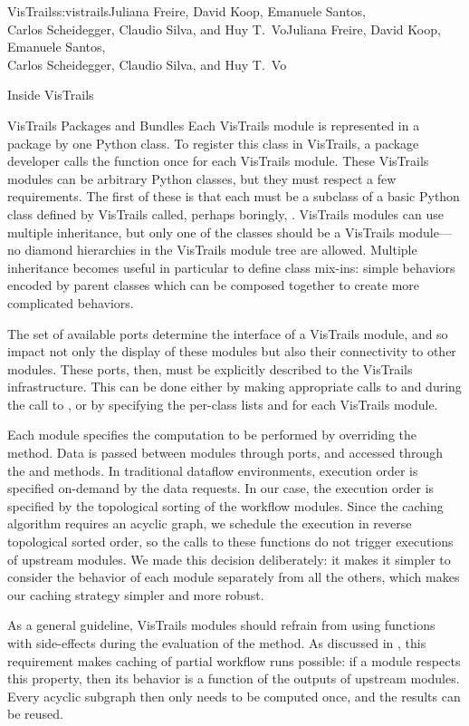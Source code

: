 \begin{aosachaptertoc}{VisTrails}{s:vistrails}{Juliana Freire, David Koop, Emanuele Santos, \\ Carlos Scheidegger, Claudio Silva, and Huy T.\ Vo}{Juliana Freire, David Koop, Emanuele Santos, \\ \hspace*{0.9cm} Carlos Scheidegger, Claudio Silva, and Huy T.\ Vo}
\begin{aosasect1}{Inside VisTrails}
\begin{aosasect2}{VisTrails Packages and Bundles}
Each VisTrails module is represented in a package by one Python
class. To register this class in VisTrails, a package developer calls
the  function once for each VisTrails module.  These
VisTrails modules can be arbitrary Python classes, but they must
respect a few requirements. The first of these is that each must be a
subclass of a basic Python class defined by VisTrails called, perhaps
boringly, .  VisTrails modules can use multiple
inheritance, but only one of the classes should be a VisTrails
module---no diamond hierarchies in the VisTrails module tree are
allowed. Multiple inheritance becomes useful in particular to define
class mix-ins: simple behaviors encoded by parent classes which can be
composed together to create more complicated behaviors.

The set of available ports determine the interface of a VisTrails
module, and so impact not only the display of these modules but also
their connectivity to other modules. These ports, then, must be
explicitly described to the VisTrails infrastructure. This can be done
either by making appropriate calls to  and
 during the call to , or by
specifying the per-class lists  and
 for each VisTrails module.

Each module specifies the computation to be performed by overriding
the  method. Data is passed between modules through
ports, and accessed through the  and
 methods.  In traditional dataflow environments,
execution order is specified on-demand by the data requests. In our
case, the execution order is specified by the topological sorting of the workflow
modules. Since the caching algorithm requires an acyclic graph, we
schedule the execution in reverse topological sorted order, so the
calls to these functions do not trigger executions of upstream
modules. We made this decision deliberately: it makes it simpler to
consider the behavior of each module separately from all the others,
which makes our caching strategy simpler and more robust.

As a general guideline, VisTrails modules should refrain from using
functions with side-effects during the evaluation of the
 method. As discussed in
, this requirement makes caching
of partial workflow runs possible: if a module respects this property,
then its behavior is a function of the outputs of upstream
modules. Every acyclic subgraph then only needs to be computed once,
and the results can be reused.


\end{aosasect2}
\end{aosasect1}
\end{aosachaptertoc}

